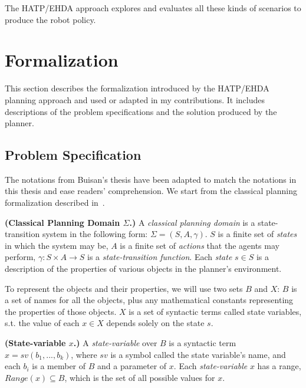 The HATP/EHDA approach explores and evaluates all these kinds of scenarios to produce the robot policy.


\section{Formalization}

This section describes the formalization introduced by the HATP/EHDA planning approach and used or adapted in my contributions. It includes descriptions of the problem specifications and the solution produced by the planner.  

\subsection*{Problem Specification}
\label{sec:problem_spec}

The notations from Buisan's thesis have been adapted to match the notations in this thesis and ease readers' comprehension. We start from the classical planning formalization described in~\cite{ghallab2016automated}.

\begin{definition}
    \textbf{(Classical Planning Domain $\Sigma$.)} A \emph{classical planning domain} is a state-transition system in the following form: $\Sigma = (S, A,\gamma)$. $S$ is a finite set of \emph{states} in which the system may be, $A$ is a finite set of \emph{actions} that the agents may perform, $\gamma: S \times A \rightarrow S$ is a \emph{state-transition function}. Each \emph{state} $s \in S$ is a description of the properties of various objects in the planner's environment. 
    \label{def:classical_planning_domain}
\end{definition}

To represent the objects and their properties, we will use two sets $B$ and $X$: $B$ is a set of names for all the objects, plus any mathematical constants representing the properties of those objects. $X$ is a set of syntactic terms called state variables, s.t. the value of each $x \in X$ depends solely on the state $s$.

\begin{definition}
    \textbf{(State-variable $x$.)} A \emph{state-variable} over $B$ is a syntactic term $x = sv(b_1, ..., b_k)$, where $sv$ is a symbol called the state variable's name, and each $b_i$ is a member of $B$ and a parameter of $x$. Each \emph{state-variable} $x$ has a range, $\textit{Range}(x) \subseteq B$, which is the set of all possible values for $x$.
    \label{def:state_variable}
\end{definition}



